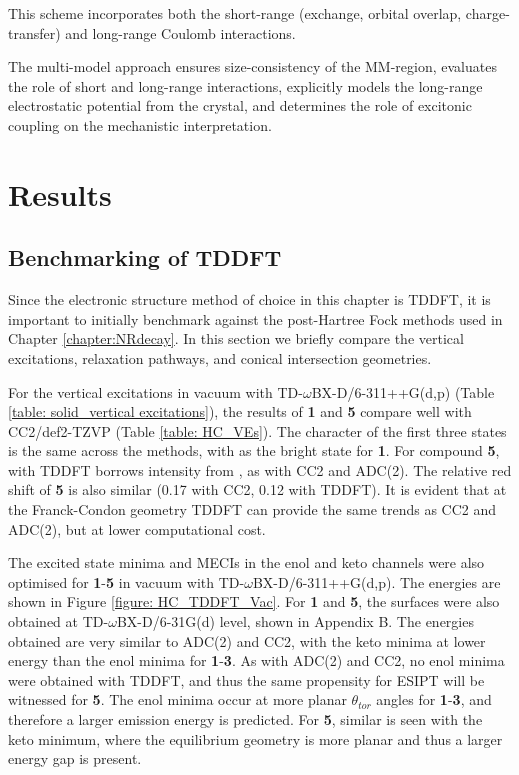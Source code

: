 This scheme incorporates both the short-range (exchange, orbital overlap, charge-transfer) and long-range Coulomb interactions. 

The multi-model approach ensures size-consistency of the MM-region, evaluates the role of short and long-range interactions, explicitly models the long-range electrostatic potential from the crystal, and determines the role of excitonic coupling on the mechanistic interpretation.
\section{Results}\label{section: Inter_Results}
\subsection{Benchmarking of TDDFT}\label{section: Inter_benchmark}
Since the electronic structure method of choice in this chapter is \ac{TDDFT}, it is important to initially benchmark against the post-Hartree Fock methods used in Chapter \ref{chapter:NRdecay}. In this section we briefly compare the vertical excitations, relaxation pathways, and conical intersection geometries.

For the vertical excitations in vacuum with TD-$\omega$BX-D/6-311++G(d,p) (Table \ref{table: solid_vertical excitations}), the results of \textbf{1} and \textbf{5} compare well with CC2/def2-TZVP (Table \ref{table: HC_VEs}). The character of the first three states is the same across the  methods, with \sone{} as the bright state \pipistar{} for \textbf{1}. For compound \textbf{5}, with TDDFT \stwo{} borrows intensity from \sone{}, as with CC2 and ADC(2). The relative red shift of \textbf{5} is also similar (0.17 with CC2, 0.12 with TDDFT). It is evident that at the Franck-Condon geometry TDDFT can provide the same trends as CC2 and ADC(2), but at lower computational cost.

The excited state minima and \ac{MECI}s in the enol and keto channels were also optimised for \textbf{1}-\textbf{5} in vacuum with TD-$\omega$BX-D/6-311++G(d,p). The energies are shown in Figure \ref{figure: HC_TDDFT_Vac}. For \textbf{1} and \textbf{5}, the surfaces were also obtained at TD-$\omega$BX-D/6-31G(d) level, shown in Appendix B. The energies obtained are very similar to ADC(2) and CC2, with the keto minima at lower energy than the enol minima for \textbf{1}-\textbf{3}. As with ADC(2) and CC2, no enol minima were obtained with TDDFT, and thus the same propensity for ESIPT will be witnessed for \textbf{5}. The enol minima occur at more planar $\theta_{tor}$ angles for \textbf{1}-\textbf{3}, and therefore a larger emission energy is predicted. For \textbf{5}, similar is seen with the keto minimum, where the equilibrium geometry is more planar and thus a larger energy gap is present.

